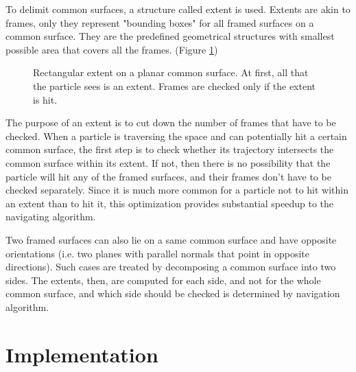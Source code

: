 \documentclass[12pt, a4paper]{article}
\begin{document}
To delimit common surfaces, a structure called extent is used. Extents are akin to frames, only they represent "bounding boxes" for all framed surfaces on a common surface. They are the predefined geometrical structures with smallest possible area that covers all the frames. (Figure \ref{fig:extent})
\begin{figure}[h]
	\centering
	
	\caption{Rectangular extent on a planar common surface. At first, all that the particle sees is an extent. Frames are checked only if the extent is hit.}
	\label{fig:extent}
\end{figure}

The purpose of an extent is to cut down the number of frames that have to be checked. When a particle is traversing the space and can potentially hit a certain common surface, the first step is to check whether its trajectory intersects the common surface within its extent. If not, then there is no possibility that the particle will hit any of the framed surfaces, and their frames don't have to be checked separately. Since it is much more common for a particle not to hit within an extent than to hit it, this optimization provides substantial speedup to the navigating algorithm.

Two framed surfaces can also lie on a same common surface and have opposite orientations (i.e. two planes with parallel normals that point in opposite directions). Such cases are treated by decomposing a common surface into two sides. The extents, then, are computed for each side, and not for the whole common surface, and which side should be checked is determined by navigation algorithm.

\section{Implementation}
\end{document}

